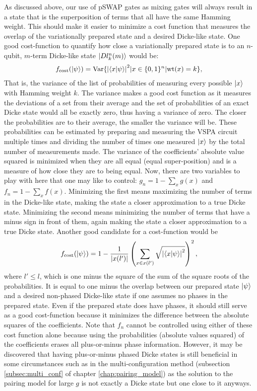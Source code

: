 \documentclass[Dual]{msu-thesis}
\begin{document}
\hspace{5mm} As discussed above, our use of pSWAP gates as mixing gates will always result in a state that is the superposition of terms that all have the same Hamming weight. This should make it easier to minimize a cost function that measures the overlap of the variationally prepared state and a desired Dicke-like state. One good cost-function to quantify how close a variationally prepared state is to an $n$-qubit, $m$-term Dicke-like state $\ket{Dl^n_k(m)}$  would be:
\begin{align}
f_{\text{cost}}(\ket{\psi})=\text{Var}\{\abs{\bra{x}\ket{\psi}}^2 | x\in\{0,1\}^n | \text{wt}(x)=k \},
\end{align}     
That is, the variance of the list of probabilities of measuring every possible $\ket{x}$ with Hamming weight $k$. The variance makes a good cost function as it measures the deviations of a set from their average and the set of probabilities of an exact Dicke state would all be exactly zero, thus having a variance of zero. The closer the probabilities are to their average, the smaller the variance will be. These probabilities can be estimated by preparing and measuring the VSPA circuit multiple times and dividing the number of times one measured $\ket{x}$ by the total number of measurements made. The variance of the coefficients' absolute value squared is minimized when they are all equal (equal super-position) and is a measure of how close they are to being equal. Now, there are two variables to play with here that one may like to control: $g_n=1-\sum_xg(x)$ and $f_n=1-\sum_xf(x)$. Minimizing the first means maximizing the number of terms in the Dicke-like state, making the state a closer approximation to a true Dicke state. Minimizing the second means minimizing the number of terms that have a minus sign in front of them, again making the state a closer approximation to a true Dicke state. Another good candidate for a cost-function would be
\begin{align}
f_{\text{cost}}(\ket{\psi})=1-\frac{1}{|x(l')|}\left(\sum_{x\in x(l')}\sqrt{\abs{\bra{x}\ket{\psi}}^2}\right)^2
,\end{align}
where $l'\leq l$, which is one minus the square of the sum of the square roots of the probabilities. It is equal to one minus the overlap between our prepared state $\ket{\psi}$ and a desired non-phased Dicke-like state if one assumes no phases in the prepared state. Even if the prepared state does have phases, it should still serve as a good cost-function because it minimizes the difference between the absolute squares of the coefficients. Note that $f_n$ cannot be controlled using either of these cost function alone because using the probabilities (absolute values squared) of the coefficients erases all plus-or-minus phase information. However, it may be discovered that having plus-or-minus phased Dicke states is still beneficial in some circumstances such as in the multi-configuration method (subsection \ref{subsec:multi_conf} of chapter \ref{chap:pairing_model}) as the solution to the pairing model for large $g$ is not exactly a Dicke state but one close to it anyways.
\end{document}
